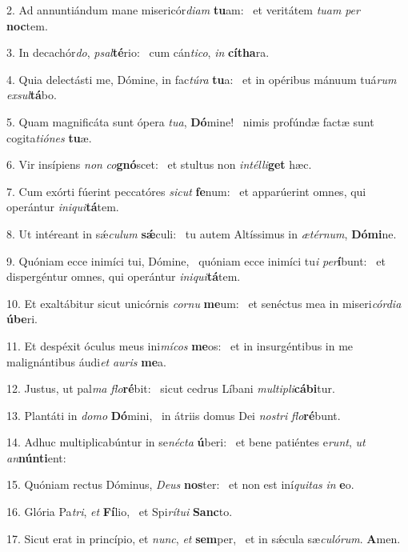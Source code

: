 2. Ad annuntiándum mane misericór\textit{di}\textit{am} \textbf{tu}am: \ast\  et veritátem \textit{tu}\textit{am} \textit{per} \textbf{noc}tem.\

3. In decachór\textit{do}, \textit{psal}\textbf{té}rio: \ast\  cum cán\textit{ti}\textit{co}, \textit{in} \textbf{cí}\textbf{tha}ra.\

4. Quia delectásti me, Dómine, in fac\textit{tú}\textit{ra} \textbf{tu}a: \ast\  et in opéribus mánuum tuá\textit{rum} \textit{ex}\textit{sul}\textbf{tá}bo.\

5. Quam magnificáta sunt ópera \textit{tu}\textit{a}, \textbf{Dó}mine! \ast\  nimis profúndæ factæ sunt cogita\textit{ti}\textit{ó}\textit{nes} \textbf{tu}æ.\

6. Vir insípiens \textit{non} \textit{co}\textbf{gnó}scet: \ast\  et stultus non \textit{in}\textit{tél}\textit{li}\textbf{get} hæc.\

7. Cum exórti fúerint peccatóres \textit{sic}\textit{ut} \textbf{fe}num: \ast\  et apparúerint omnes, qui operántur \textit{in}\textit{i}\textit{qui}\textbf{tá}tem.\

8. Ut intéreant in sǽ\textit{cu}\textit{lum} \textbf{sǽ}culi: \ast\  tu autem Altíssimus in \textit{æ}\textit{tér}\textit{num}, \textbf{Dó}\textbf{mi}ne.\

9. Quóniam ecce inimíci tui, Dómine, \dag\  quóniam ecce inimíci tu\textit{i} \textit{per}\textbf{í}bunt: \ast\  et dispergéntur omnes, qui operántur \textit{in}\textit{i}\textit{qui}\textbf{tá}tem.\

10. Et exaltábitur sicut unicórnis \textit{cor}\textit{nu} \textbf{me}um: \ast\  et senéctus mea in miseri\textit{cór}\textit{di}\textit{a} \textbf{ú}\textbf{be}ri.\

11. Et despéxit óculus meus ini\textit{mí}\textit{cos} \textbf{me}os: \ast\  et in insurgéntibus in me malignántibus áudi\textit{et} \textit{au}\textit{ris} \textbf{me}a.\

12. Justus, ut pal\textit{ma} \textit{flo}\textbf{ré}bit: \ast\  sicut cedrus Líbani \textit{mul}\textit{ti}\textit{pli}\textbf{cá}\textbf{bi}tur.\

13. Plantáti in \textit{do}\textit{mo} \textbf{Dó}mini, \ast\  in átriis domus Dei \textit{nos}\textit{tri} \textit{flo}\textbf{ré}bunt.\

14. Adhuc multiplicabúntur in se\textit{néc}\textit{ta} \textbf{ú}beri: \ast\  et bene patiéntes e\textit{runt}, \textit{ut} \textit{an}\textbf{nún}\textbf{ti}ent:\

15. Quóniam rectus Dóminus, \textit{De}\textit{us} \textbf{nos}ter: \ast\  et non est iní\textit{qui}\textit{tas} \textit{in} \textbf{e}o.\

16. Glória Pa\textit{tri}, \textit{et} \textbf{Fí}lio, \ast\  et Spi\textit{rí}\textit{tu}\textit{i} \textbf{Sanc}to.\

17. Sicut erat in princípio, et \textit{nunc}, \textit{et} \textbf{sem}per, \ast\  et in sǽcula sæ\textit{cu}\textit{ló}\textit{rum}. \textbf{A}men.\

